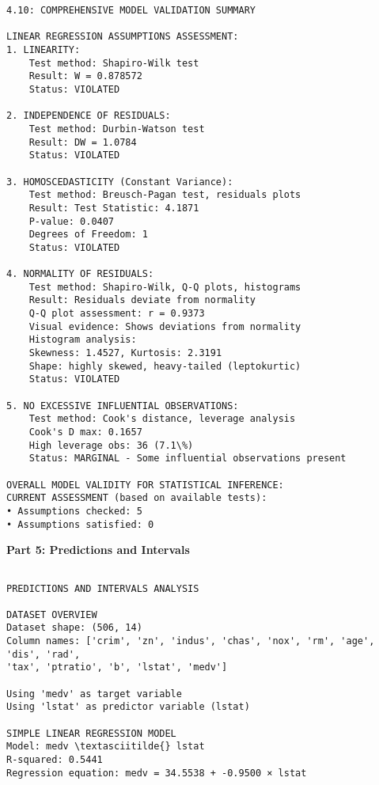 \documentclass[8pt, twocolumn]{extarticle}
\begin{document}
    \begin{Verbatim}[commandchars=\\\{\}]
4.10: COMPREHENSIVE MODEL VALIDATION SUMMARY

LINEAR REGRESSION ASSUMPTIONS ASSESSMENT:
1. LINEARITY:
    Test method: Shapiro-Wilk test
    Result: W = 0.878572
    Status: VIOLATED

2. INDEPENDENCE OF RESIDUALS:
    Test method: Durbin-Watson test
    Result: DW = 1.0784
    Status: VIOLATED

3. HOMOSCEDASTICITY (Constant Variance):
    Test method: Breusch-Pagan test, residuals plots
    Result: Test Statistic: 4.1871
    P-value: 0.0407
    Degrees of Freedom: 1
    Status: VIOLATED

4. NORMALITY OF RESIDUALS:
    Test method: Shapiro-Wilk, Q-Q plots, histograms
    Result: Residuals deviate from normality
    Q-Q plot assessment: r = 0.9373
    Visual evidence: Shows deviations from normality
    Histogram analysis:
    Skewness: 1.4527, Kurtosis: 2.3191
    Shape: highly skewed, heavy-tailed (leptokurtic)
    Status: VIOLATED

5. NO EXCESSIVE INFLUENTIAL OBSERVATIONS:
    Test method: Cook's distance, leverage analysis
    Cook's D max: 0.1657
    High leverage obs: 36 (7.1\%)
    Status: MARGINAL - Some influential observations present

OVERALL MODEL VALIDITY FOR STATISTICAL INFERENCE:
CURRENT ASSESSMENT (based on available tests):
• Assumptions checked: 5
• Assumptions satisfied: 0
    \end{Verbatim}

    \centering
    
    \textbf{Part 5: Predictions and Intervals}
    \begin{Verbatim}[commandchars=\\\{\}]

PREDICTIONS AND INTERVALS ANALYSIS

DATASET OVERVIEW
Dataset shape: (506, 14)
Column names: ['crim', 'zn', 'indus', 'chas', 'nox', 'rm', 'age', 'dis', 'rad',
'tax', 'ptratio', 'b', 'lstat', 'medv']

Using 'medv' as target variable
Using 'lstat' as predictor variable (lstat)

SIMPLE LINEAR REGRESSION MODEL
Model: medv \textasciitilde{} lstat
R-squared: 0.5441
Regression equation: medv = 34.5538 + -0.9500 × lstat

    \end{Verbatim}
\end{document}
